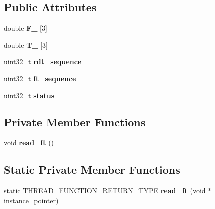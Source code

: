 \subsection*{Public Attributes}
\begin{DoxyCompactItemize}
\item 
double {\bfseries F\+\_\+} \mbox{[}3\mbox{]}\hypertarget{classati__ft__sensor_1_1AtiFTSensor_a0ecc044012d8459b62512a9affb46067}{}\label{classati__ft__sensor_1_1AtiFTSensor_a0ecc044012d8459b62512a9affb46067}

\item 
double {\bfseries T\+\_\+} \mbox{[}3\mbox{]}\hypertarget{classati__ft__sensor_1_1AtiFTSensor_a167f338cd1552c8be72e2ab142826a88}{}\label{classati__ft__sensor_1_1AtiFTSensor_a167f338cd1552c8be72e2ab142826a88}

\item 
uint32\+\_\+t {\bfseries rdt\+\_\+sequence\+\_\+}\hypertarget{classati__ft__sensor_1_1AtiFTSensor_a7ca149744596b46315fa2ef591a08e7c}{}\label{classati__ft__sensor_1_1AtiFTSensor_a7ca149744596b46315fa2ef591a08e7c}

\item 
uint32\+\_\+t {\bfseries ft\+\_\+sequence\+\_\+}\hypertarget{classati__ft__sensor_1_1AtiFTSensor_a45931532f785eb26b5a8e85c5f7ab2d5}{}\label{classati__ft__sensor_1_1AtiFTSensor_a45931532f785eb26b5a8e85c5f7ab2d5}

\item 
uint32\+\_\+t {\bfseries status\+\_\+}\hypertarget{classati__ft__sensor_1_1AtiFTSensor_a75557dcf54e92df5e6b491cca26c57ee}{}\label{classati__ft__sensor_1_1AtiFTSensor_a75557dcf54e92df5e6b491cca26c57ee}

\end{DoxyCompactItemize}
\subsection*{Private Member Functions}
\begin{DoxyCompactItemize}
\item 
void {\bfseries read\+\_\+ft} ()\hypertarget{classati__ft__sensor_1_1AtiFTSensor_ae52996f61d96739b05c01815c386c3cc}{}\label{classati__ft__sensor_1_1AtiFTSensor_ae52996f61d96739b05c01815c386c3cc}

\end{DoxyCompactItemize}
\subsection*{Static Private Member Functions}
\begin{DoxyCompactItemize}
\item 
static T\+H\+R\+E\+A\+D\+\_\+\+F\+U\+N\+C\+T\+I\+O\+N\+\_\+\+R\+E\+T\+U\+R\+N\+\_\+\+T\+Y\+PE {\bfseries read\+\_\+ft} (void $\ast$instance\+\_\+pointer)\hypertarget{classati__ft__sensor_1_1AtiFTSensor_a96564d744e3a5daeb8f56395ba7e832f}{}\label{classati__ft__sensor_1_1AtiFTSensor_a96564d744e3a5daeb8f56395ba7e832f}

\end{DoxyCompactItemize}
